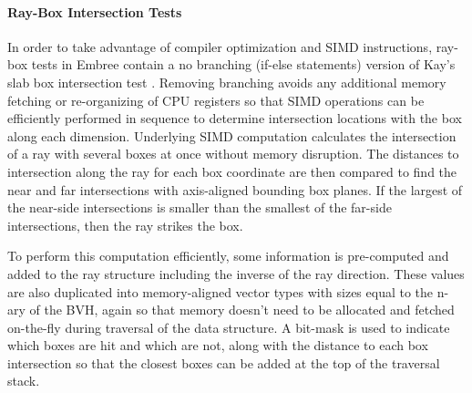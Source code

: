\paragraph{Ray-Box Intersection Tests}

In order to take advantage of compiler optimization and SIMD instructions,
ray-box tests in Embree contain a no branching (if-else statements) version of
Kay's slab box intersection test \cite{Kay_1986}. Removing branching avoids any
additional memory fetching or re-organizing of CPU registers so that SIMD
operations can be efficiently performed in sequence to determine intersection
locations with the box along each dimension. Underlying SIMD computation
calculates the intersection of a ray with several boxes at once without memory
disruption. The distances to intersection along the ray for each box coordinate
are then compared to find the near and far intersections with axis-aligned
bounding box planes. If the largest of the near-side intersections is smaller
than the smallest of the far-side intersections, then the ray strikes the box.

To perform this computation efficiently, some information is pre-computed and
added to the ray structure including the inverse of the ray direction. These
values are also duplicated into memory-aligned vector types with sizes equal to
the n-ary of the BVH, again so that memory doesn't need to be allocated and
fetched on-the-fly during traversal of the data structure. A bit-mask is used to
indicate which boxes are hit and which are not, along with the distance to each
box intersection so that the closest boxes can be added at the top of the
traversal stack.


  

